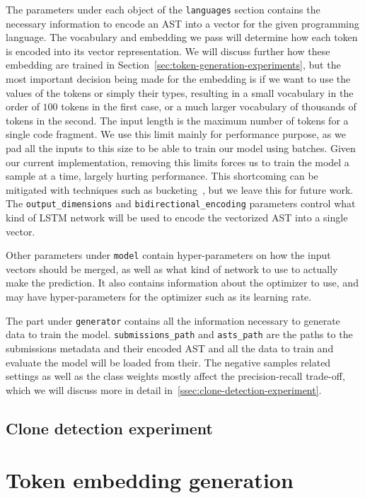 The parameters under each object of the \lstinline{languages} section contains
the necessary information to encode an AST into a vector for the given
programming language. The vocabulary and embedding we pass will determine how
each token is encoded into its vector representation. We will discuss further
how these embedding are trained in
Section~\ref{sec:token-generation-experiments}, but the most important decision
being made for the embedding is if we want to use the values of the tokens or
simply their types, resulting in a small vocabulary in the order of $100$ tokens
in the first case, or a much larger vocabulary of thousands of tokens in the
second. The input length is the maximum number of tokens for a single code
fragment. We use this limit mainly for performance purpose, as we pad all the
inputs to this size to be able to train our model using batches. Given our
current implementation, removing this limits forces us to train the model a
sample at a time, largely hurting performance. This shortcoming can be mitigated
with techniques such as bucketing~\cite{DBLP:journals/corr/abs-1708-05604}, but
we leave this for future work. The \lstinline{output_dimensions} and
\lstinline{bidirectional_encoding} parameters control what kind of LSTM network
will be used to encode the vectorized AST into a single vector.

Other parameters under \lstinline{model} contain hyper-parameters on how the
input vectors should be merged, as well as what kind of network to use to
actually make the prediction. It also contains information about the optimizer
to use, and may have hyper-parameters for the optimizer such as its learning
rate.

The part under \lstinline{generator} contains all the information necessary to
generate data to train the model. \lstinline{submissions_path} and
\lstinline{asts_path} are the paths to the submissions metadata and their
encoded AST and all the data to train and evaluate the model will be loaded from
their. The negative samples related settings as well as the class weights mostly
affect the precision-recall trade-off, which we will discuss more in detail
in~\ref{ssec:clone-detection-experiment}.
\subsection{\label{ssec:clone-detection-experiment}Clone detection experiment}


\section{\label{sec:token-generation-experiments}Token embedding generation}
